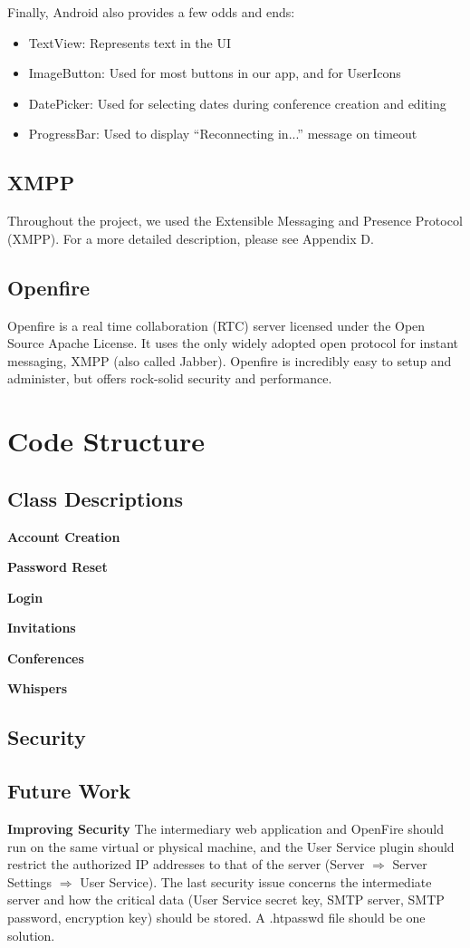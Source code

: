 \documentclass[12pt, letterpaper]{article}
\begin{document}
Finally, Android also provides a few odds and ends:
\begin{itemize}
\item TextView: Represents text in the UI
\item ImageButton: Used for most buttons in our app, and for UserIcons
\item DatePicker: Used for selecting dates during conference creation and editing
\item ProgressBar: Used to display “Reconnecting in...” message on timeout
\end{itemize}

\subsection{XMPP}
Throughout the project, we used the Extensible Messaging and Presence Protocol (XMPP). For a more detailed description, please see Appendix D.

\subsection{Openfire}
Openfire is a real time collaboration (RTC) server licensed under the Open Source Apache License. It uses the only widely adopted open protocol for instant messaging, XMPP (also called Jabber). Openfire is incredibly easy to setup and administer, but offers rock-solid security and performance.

\section{Code Structure}

\subsection{Class Descriptions}

\textbf{Account Creation}

\textbf{Password Reset}

\textbf{Login}

\textbf{Invitations} 

\textbf{Conferences}

\textbf{Whispers}

\subsection{Security}

\subsection{Future Work}
\textbf{Improving Security} The intermediary web application and OpenFire should run on the same virtual or physical machine, and the User Service plugin should restrict the authorized IP addresses to that of the server (Server $\Rightarrow$ Server Settings $\Rightarrow$ User Service). The last security issue concerns the intermediate server and how the critical data (User Service secret key, SMTP server, SMTP password, encryption key) should be stored. A .htpasswd file should be one solution.
\end{document}
